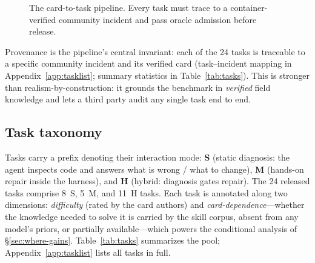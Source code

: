 \documentclass[11pt]{article}
\begin{document}
\begin{figure}[t]
\centering
{}
\caption{The card-to-task pipeline. Every task must trace to a container-verified community incident and pass oracle admission before release.}
\label{fig:pipeline}
\end{figure}

Provenance is the pipeline's central invariant: each of the 24 tasks is traceable to a specific community incident and its verified card (task--incident mapping in Appendix~\ref{app:tasklist}; summary statistics in Table~\ref{tab:tasks}).
This is stronger than realism-by-construction: it grounds the benchmark in \emph{verified} field knowledge and lets a third party audit any single task end to end.

\subsection{Task taxonomy}
\label{sec:taxonomy}

Tasks carry a prefix denoting their interaction mode: \textbf{S} (static diagnosis: the agent inspects code and answers what is wrong / what to change), \textbf{M} (hands-on repair inside the harness), and \textbf{H} (hybrid: diagnosis gates repair).
The 24 released tasks comprise 8~S, 5~M, and 11~H tasks.
Each task is annotated along two dimensions: \emph{difficulty} (rated by the card authors) and \emph{card-dependence}---whether the knowledge needed to solve it is carried by the skill corpus, absent from any model's priors, or partially available---which powers the conditional analysis of \S\ref{sec:where-gains}.
Table~\ref{tab:tasks} summarizes the pool; Appendix~\ref{app:tasklist} lists all tasks in full.

\begin{table}[t]
\centering
{}
\caption{Summary of the 24-task pool. Full task--incident mapping and per-task metadata are in Appendix~\ref{app:tasklist}.}
\label{tab:tasks}
\end{table}
\end{document}
